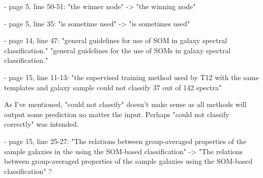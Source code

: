 - page 5, line 50-51:
"the winner node" ->
"the winning node"

- page 5, line 35:
"is sometime used" ->
"is sometimes used"

- page 14, line 47:
"general guidelines for use of SOM in galaxy spectral classification."
"general guidelines for the use of SOMs in galaxy spectral classification."

- page 15, line 11-13:
"the supervised training method used by T12 with the same templates and galaxy sample could not classify 37 out of 142 spectra"

As I've mentioned, "could not classify" doesn't make sense as all methods will output some prediction no matter the input.  Perhaps "could not classify correctly" was intended.

- page 15, line 25-27:
"The relations between group-averaged properties of the sample galaxies in the using the SOM-based classification" ->
"The relations between group-averaged properties of the sample galaxies using the SOM-based classification" ?